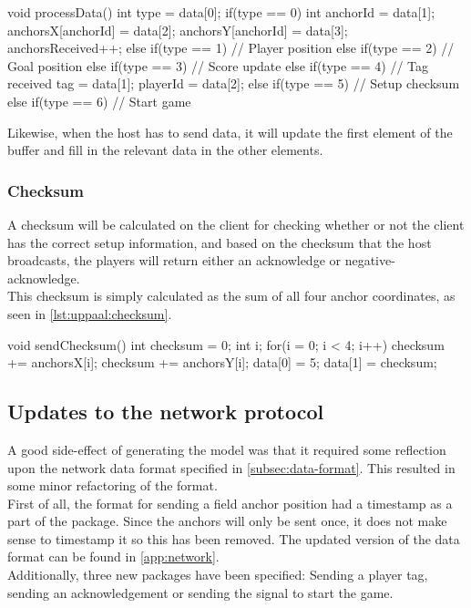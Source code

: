 \begin{uppaalcode}[caption={Processing Data in \uppaal model}, captionpos=b,label={lst:uppaal:processData}]
void processData(){
    int type = data[0];
    if(type == 0){
        int anchorId = data[1];
        anchorsX[anchorId] = data[2];
        anchorsY[anchorId] = data[3];
        anchorsReceived++;
    } else if(type == 1){
        // Player position
     } else if(type == 2){
        // Goal position
     } else if(type == 3){
        // Score update
     } else if(type == 4){
        // Tag received
        tag = data[1];
        playerId = data[2];
     } else if(type == 5){
        // Setup checksum
     } else if(type == 6){
        // Start game
     }
 }
\end{uppaalcode}
\noindent
Likewise, when the host has to send data, it will update the first element of the buffer and fill in the relevant data in the other elements.

\subsubsection{Checksum}
A checksum will be calculated on the client for checking whether or not the client has the correct setup information, and based on the checksum that the host broadcasts, the players will return either an acknowledge or negative-acknowledge.
\\
This checksum is simply calculated as the sum of all four anchor coordinates, as seen in \autoref{lst:uppaal:checksum}.

\begin{uppaalcode}[caption={Calculating checksum in \uppaal model}, captionpos=b,label={lst:uppaal:checksum}]
void sendChecksum(){
    int checksum = 0;
    int i;
    for(i = 0; i < 4; i++){
        checksum += anchorsX[i];
        checksum += anchorsY[i];
    }
    data[0] = 5;
    data[1] = checksum;
}
\end{uppaalcode}

\subsection{Updates to the network protocol}\label{subsec:sprint3networkupdate}
A good side-effect of generating the \uppaal model was that it required some reflection upon the network data format specified in \autoref{subsec:data-format}.
This resulted in some minor refactoring of the format.
\\
First of all, the format for sending a field anchor position had a timestamp as a part of the package.
Since the anchors will only be sent once, it does not make sense to timestamp it so this has been removed.
The updated version of the data format can be found in \autoref{app:network}.
\\
Additionally, three new packages have been specified: Sending a player tag, sending an acknowledgement or sending the signal to start the game.

